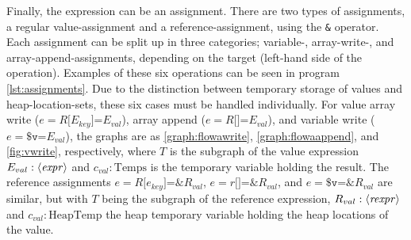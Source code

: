 Finally, the expression can be an assignment. There are two types of assignments, a regular value-assignment and a reference-assignment, using the \texttt{\&} operator. Each assignment can be split up in three categories; variable-, array-write-, and array-append-assignments, depending on the target (left-hand side of the operation). Examples of these six operations can be seen in program \ref{lst:assignments}. Due to the distinction between temporary storage of values and heap-location-sets, these six cases must be handled individually. For value array write ($e = R\texttt{[$E_{key}$]=} E_{val}$), array append ($e = R\texttt{[]=} E_{val}$), and variable write ($e = \texttt{\$v=} E_{val}$), the graphs are as \ref{graph:flowawrite}, \ref{graph:flowaappend}, and \ref{fig:vwrite}, respectively, where $T$ is the subgraph of the value expression $E_{val} : \langle\mathit{expr}\rangle$ and $c_{val} : \text{Temps}$ is the temporary variable holding the result. The reference assignments $e = R\texttt{[$e_{key}$]=\&} R_{val}$, $e = r\texttt{[]=\&} R_{val}$, and $e = \texttt{\$v=\&} R_{val}$ are similar, but with $T$ being the subgraph of the reference expression, $R_{val} : \langle\mathit{rexpr}\rangle$ and $c_{val} : \text{HeapTemp}$ the heap temporary variable holding the heap locations of the value.
